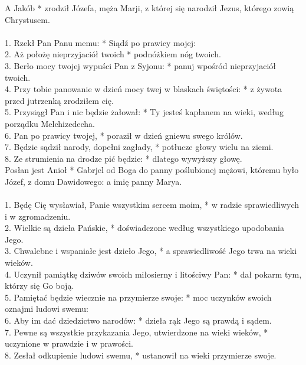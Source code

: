 \small
\vspace{-5mm}
 A Jakób * zrodził Józefa, męża Marji, z której się narodził Jezus, którego zowią Chrystusem.\\
\\
1. Rzekł Pan Panu memu: * Siądź po prawicy mojej:\\
2. Aż położę nieprzyjaciół twoich * podnóżkiem nóg twoich.\\
3. Berło mocy twojej wypuści Pan z Syjonu: * panuj wpośród nieprzyjaciół twoich.\\
4. Przy tobie panowanie w dzień mocy twej w blaskach świętości: * z żywota przed jutrzenką zrodziłem cię.\\
5. Przysiągł Pan i nic będzie żałował: * Ty jesteś kapłanem na wieki, według porządku Melchizedecha.\\
6. Pan po prawicy twojej, * poraził w dzień gniewu swego królów.\\
7. Będzie sądził narody, dopełni zagłady, * potłucze głowy wielu na ziemi.\\
8. Ze strumienia na drodze pić będzie: * dlatego wywyższy głowę.\\
 Posłan jest Anioł * Gabrjel od Boga do panny poślubionej mężowi, któremu było Józef, z domu Dawidowego: a imię panny Marya.\\
\\
1. Będę Cię wysławiał, Panie wszystkim sercem moim, * w radzie sprawiedliwych i w zgromadzeniu.\\
2. Wielkie są dzieła Pańskie, * doświadczone według wszystkiego upodobania Jego.\\
3. Chwalebne i wspaniałe jest dzieło Jego, * a sprawiedliwość Jego trwa na wieki wieków.\\
4. Uczynił pamiątkę dziwów swoich miłosierny i litościwy Pan: * dał pokarm tym, którzy się Go boją.\\
5. Pamiętać będzie wiecznie na przymierze swoje: * moc uczynków swoich oznajmi ludowi swemu:\\
6. Aby im dać dziedzictwo narodów: * dzieła rąk Jego są prawdą i sądem.\\
7. Pewne są wszystkie przykazania Jego, utwierdzone na wieki wieków, * uczynione w prawdzie i w prawości.\\
8. Zesłał odkupienie ludowi swemu, * ustanowił na wieki przymierze swoje.\\
